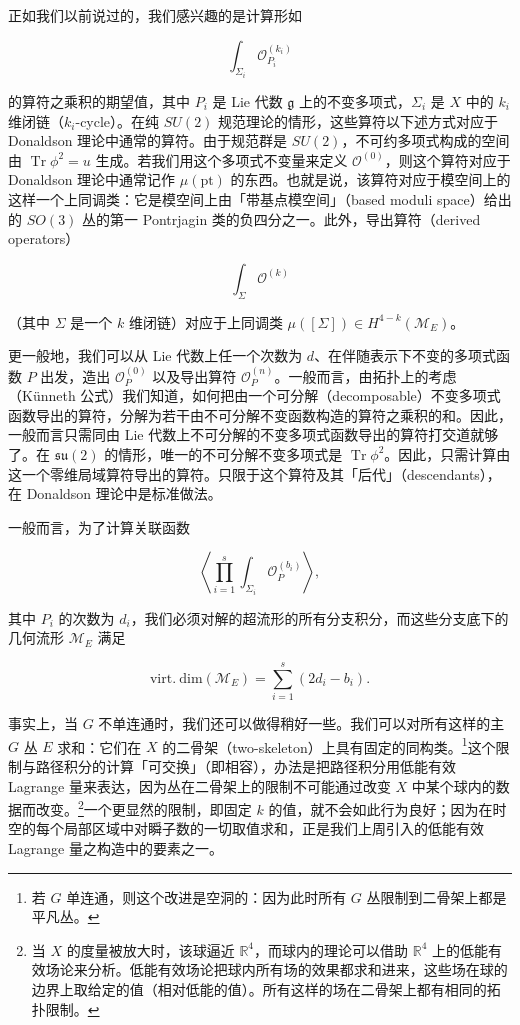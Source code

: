 正如我们以前说过的，我们感兴趣的是计算形如

\[
  \int_{\Sigma_i}\mathcal O_{P_i}^{(k_i)}
\]

的算符之乘积的期望值，其中 $P_i$ 是 Lie 代数 $\mathfrak g$ 上的不变多项式，$\Sigma_i$ 是 $X$ 中的 $k_i$ 维闭链（$k_i$-cycle）。在纯 $SU(2)$ 规范理论的情形，这些算符以下述方式对应于 Donaldson 理论中通常的算符。由于规范群是 $SU(2)$，不可约多项式构成的空间由 $\operatorname{Tr}\phi^2=u$ 生成。若我们用这个多项式不变量来定义 $\mathcal O^{(0)}$，则这个算符对应于 Donaldson 理论中通常记作 $\mu(\mathrm{pt})$ 的东西。也就是说，该算符对应于模空间上的这样一个上同调类：它是模空间上由「带基点模空间」（based moduli space）给出的 $SO(3)$ 丛的第一 Pontrjagin 类的负四分之一。此外，导出算符（derived operators）

\[
  \int_\Sigma\mathcal O^{(k)}
\]

（其中 $\Sigma$ 是一个 $k$ 维闭链）对应于上同调类 $\mu([\Sigma])\in H^{4-k}(\mathcal M_E)$。


更一般地，我们可以从 Lie 代数上任一个次数为 $d$、在伴随表示下不变的多项式函数 $P$ 出发，造出 $\mathcal O_P^{(0)}$ 以及导出算符 $\mathcal O_P^{(n)}$。一般而言，由拓扑上的考虑（Künneth 公式）我们知道，如何把由一个可分解（decomposable）不变多项式函数导出的算符，分解为若干由不可分解不变函数构造的算符之乘积的和。因此，一般而言只需同由 Lie 代数上不可分解的不变多项式函数导出的算符打交道就够了。在 $\mathfrak{su}(2)$ 的情形，唯一的不可分解不变多项式是 $\operatorname{Tr}\phi^2$。因此，只需计算由这一个零维局域算符导出的算符。只限于这个算符及其「后代」（descendants），在 Donaldson 理论中是标准做法。

一般而言，为了计算关联函数

\[
  \left\langle\prod_{i=1}^{s}\int_{\Sigma_i}\mathcal O_{P}^{(b_i)}\right\rangle,
\]

其中 $P_i$ 的次数为 $d_i$，我们必须对解的超流形的所有分支积分，而这些分支底下的几何流形 $\mathcal M_E$ 满足

\[
  \mathrm{virt.\ dim}(\mathcal M_E)=\sum_{i=1}^{s}(2d_i-b_i).
\]

事实上，当 $G$ 不单连通时，我们还可以做得稍好一些。我们可以对所有这样的主 $G$ 丛 $E$ 求和：它们在 $X$ 的二骨架（two-skeleton）上具有固定的同构类。\footnote{若 $G$ 单连通，则这个改进是空洞的：因为此时所有 $G$ 丛限制到二骨架上都是平凡丛。}这个限制与路径积分的计算「可交换」（即相容），办法是把路径积分用低能有效 Lagrange 量来表达，因为丛在二骨架上的限制不可能通过改变 $X$ 中某个球内的数据而改变。\footnote{当 $X$ 的度量被放大时，该球逼近 $\mathbb{R}^4$，而球内的理论可以借助 $\mathbb{R}^4$ 上的低能有效场论来分析。低能有效场论把球内所有场的效果都求和进来，这些场在球的边界上取给定的值（相对低能的值）。所有这样的场在二骨架上都有相同的拓扑限制。}一个更显然的限制，即固定 $k$ 的值，就不会如此行为良好；因为在时空的每个局部区域中对瞬子数的一切取值求和，正是我们上周引入的低能有效 Lagrange 量之构造中的要素之一。

